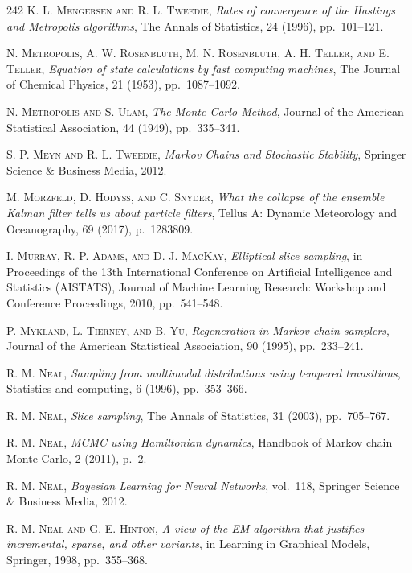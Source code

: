 \begin{thebibliography}{242}
\textsc{K. L. Mengersen and R. L. Tweedie},
\textit{Rates of convergence of the Hastings and Metropolis algorithms},
The Annals of Statistics, 24 (1996), pp.\ 101--121.

\textsc{N. Metropolis, A. W. Rosenbluth, M. N. Rosenbluth, A. H. Teller, and E. Teller},
\textit{Equation of state calculations by fast computing machines},
The Journal of Chemical Physics, 21 (1953), pp.\ 1087--1092.

\textsc{N. Metropolis and S. Ulam},
\textit{The Monte Carlo Method},
Journal of the American Statistical Association, 44 (1949), pp.\ 335--341.

\textsc{S. P. Meyn and R. L. Tweedie},
\textit{Markov Chains and Stochastic Stability},
Springer Science \& Business Media, 2012.

\textsc{M. Morzfeld, D. Hodyss, and C. Snyder},
\textit{What the collapse of the ensemble Kalman filter tells us about particle filters},
Tellus A: Dynamic Meteorology and Oceanography, 69 (2017), p.\ 1283809.

\textsc{I. Murray, R. P. Adams, and D. J. MacKay},
\textit{Elliptical slice sampling},
in Proceedings of the 13th International Conference on Artificial Intelligence and Statistics (AISTATS), Journal of Machine Learning Research: Workshop and Conference Proceedings, 2010, pp.\ 541--548.

\textsc{P. Mykland, L. Tierney, and B. Yu},
\textit{Regeneration in Markov chain samplers},
Journal of the American Statistical Association, 90 (1995), pp.\ 233--241.

\textsc{R. M. Neal},
\textit{Sampling from multimodal distributions using tempered transitions},
Statistics and computing, 6 (1996), pp.\ 353--366.

\textsc{R. M. Neal},
\textit{Slice sampling},
The Annals of Statistics, 31 (2003), pp.\ 705--767.

\textsc{R. M. Neal},
\textit{MCMC using Hamiltonian dynamics},
Handbook of Markov chain Monte Carlo, 2 (2011), p.\ 2.

\textsc{R. M. Neal},
\textit{Bayesian Learning for Neural Networks},
vol.\ 118, Springer Science \& Business Media, 2012.

\textsc{R. M. Neal and G. E. Hinton},
\textit{A view of the EM algorithm that justifies incremental, sparse, and other variants},
in Learning in Graphical Models, Springer, 1998, pp.\ 355--368.


\end{thebibliography}
